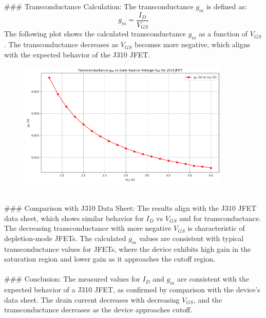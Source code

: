 \documentclass{article}
\begin{document}
### Transconductance Calculation:
The transconductance \( g_m \) is defined as:
\[
g_m = \frac{I_D}{V_{GS}}
\]
The following plot shows the calculated transconductance \( g_m \) as a function of \( V_{GS} \). The transconductance decreases as \( V_{GS} \) becomes more negative, which aligns with the expected behavior of the J310 JFET.

\begin{figure}[H]
    \centering
    \includegraphics[width=0.9\textwidth]{./img/Lab6_1_gmVSVgs.png}
    \caption{}
    \label{fig:graph1} 
\end{figure}
\\ 
### Comparison with J310 Data Sheet:
The results align with the J310 JFET data sheet, which shows similar behavior for \( I_D \) vs \( V_{GS} \) and for transconductance. The decreasing transconductance with more negative \( V_{GS} \) is characteristic of depletion-mode JFETs. The calculated \( g_m \) values are consistent with typical transconductance values for JFETs, where the device exhibits high gain in the saturation region and lower gain as it approaches the cutoff region.
\\ \\  
### Conclusion:
The measured values for \( I_D \) and \( g_m \) are consistent with the expected behavior of a J310 JFET, as confirmed by comparison with the device's data sheet. The drain current decreases with decreasing \( V_{GS} \), and the transconductance decreases as the device approaches cutoff.
\end{document}
